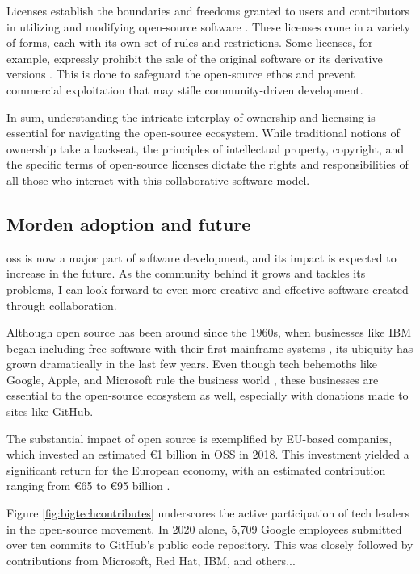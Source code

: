 Licenses establish the boundaries and freedoms granted to users and contributors in utilizing and modifying open-source software \cite{laurent2004understanding}. These licenses come in a variety of forms, each with its own set of rules and restrictions. Some licenses, for example, expressly prohibit the sale of the original software or its derivative versions \cite{madison2003reconstructing}. This is done to safeguard the open-source ethos and prevent commercial exploitation that may stifle community-driven development.

In sum, understanding the intricate interplay of ownership and licensing is essential for navigating the open-source ecosystem. While traditional notions of ownership take a backseat, the principles of intellectual property, copyright, and the specific terms of open-source licenses dictate the rights and responsibilities of all those who interact with this collaborative software model.


\subsection{Morden adoption and future}
\ac{oss} is now a major part of software development, and its impact is expected to increase in the future. As the community behind it grows and tackles its problems, I can look forward to even more creative and effective software created through collaboration.

Although open source has been around since the 1960s, when businesses like IBM began including free software with their first mainframe systems \cite{moreno2006open}, its ubiquity has grown dramatically in the last few years.  Even though tech behemoths like Google, Apple, and Microsoft rule the business world \cite{jacobides2020regulating}, these businesses are essential to the open-source ecosystem as well, especially with donations made to sites like GitHub.

The substantial impact of open source is exemplified by EU-based companies, which invested an estimated €1 billion in OSS in 2018. This investment yielded a significant return for the European economy, with an estimated contribution ranging from €65 to €95 billion \cite{blind2021impact}.

Figure \ref{fig:bigtechcontributes} underscores the active participation of tech leaders in the open-source movement.  In 2020 alone, 5,709 Google employees submitted over ten commits to GitHub's public code repository. This was closely followed by contributions from Microsoft, Red Hat, IBM, and others...

